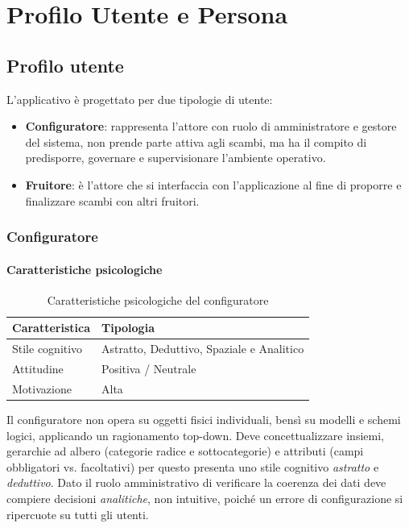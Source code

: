 \chapter{Profilo Utente e Persona}

\section{Profilo utente}

L'applicativo è progettato per due tipologie di utente:
\begin{itemize}
    \item \textbf{Configuratore}: rappresenta l'attore con ruolo di amministratore e gestore del sistema, non prende parte attiva agli scambi, ma ha il compito di predisporre, governare e supervisionare l'ambiente operativo.
    \item \textbf{Fruitore}: è l'attore che si interfaccia con l'applicazione al fine di proporre e finalizzare scambi con altri fruitori.
\end{itemize}

\subsection{Configuratore}
\subsubsection{Caratteristiche psicologiche}

\begin{table}[H]
    \centering
    \begin{tabular}{@{}>{\raggedright\arraybackslash}p{4cm}>{\raggedright\arraybackslash}p{8cm}@{}}
        \toprule
        \textbf{Caratteristica} & \textbf{Tipologia}                        \\ \midrule
        Stile cognitivo         & Astratto, Deduttivo, Spaziale e Analitico \\
        Attitudine              & Positiva / Neutrale                       \\
        Motivazione             & Alta                                      \\ \bottomrule
    \end{tabular}
    \caption{Caratteristiche psicologiche del configuratore}
\end{table}
Il configuratore non opera su oggetti fisici individuali, bensì su modelli e schemi logici, applicando un ragionamento top-down. Deve concettualizzare insiemi, gerarchie ad albero (categorie radice e sottocategorie) e attributi (campi obbligatori vs. facoltativi) per questo presenta uno stile cognitivo \emph{astratto} e \emph{deduttivo}.
Dato il ruolo amministrativo di verificare la coerenza dei dati deve compiere decisioni \emph{analitiche}, non intuitive, poiché un errore di configurazione si ripercuote su tutti gli utenti.

